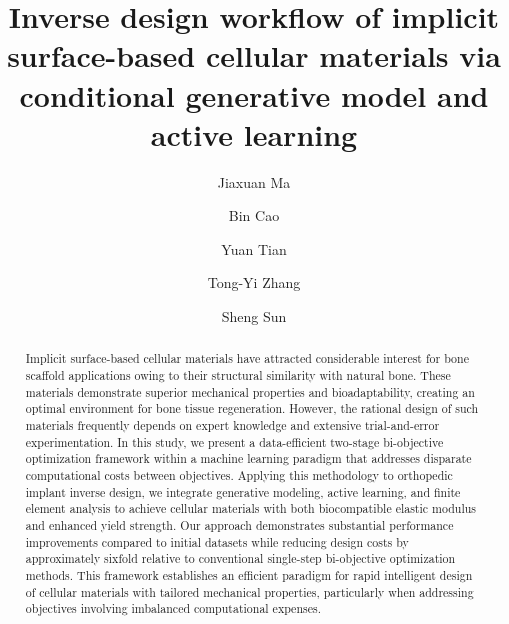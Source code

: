 \documentclass[preprint,review,12pt,authoryear]{elsarticle}
\begin{document}
\begin{frontmatter}
\title{Inverse design workflow of implicit surface-based cellular materials via conditional generative model and active learning}

\author[1]{Jiaxuan Ma}
\author[3]{Bin Cao}
\author[1]{Yuan Tian}
\author[3]{Tong-Yi Zhang}
\author[1,2]{Sheng Sun}

\address[1]{Materials Genome Institute, Shanghai University, Shanghai, 200444, China}
\address[2]{Shanghai Frontier Science Center of Mechanoinformatics, Shanghai University, Shanghai, 200444, China}
\address[3]{Advanced Materials Thrust, Hong Kong University of Science and Technology (Guangzhou), Guangzhou, 511400, Guangdong, China}


\begin{abstract}
Implicit surface-based cellular materials have attracted considerable interest for bone scaffold applications owing to their structural similarity with natural bone. These materials demonstrate superior mechanical properties and bioadaptability, creating an optimal environment for bone tissue regeneration. However, the rational design of such materials frequently depends on expert knowledge and extensive trial-and-error experimentation. In this study, we present a data-efficient two-stage bi-objective optimization framework within a machine learning paradigm that addresses disparate computational costs between objectives. Applying this methodology to orthopedic implant inverse design, we integrate generative modeling, active learning, and finite element analysis to achieve cellular materials with both biocompatible elastic modulus and enhanced yield strength. Our approach demonstrates substantial performance improvements compared to initial datasets while reducing design costs by approximately sixfold relative to conventional single-step bi-objective optimization methods. This framework establishes an efficient paradigm for rapid intelligent design of cellular materials with tailored mechanical properties, particularly when addressing objectives involving imbalanced computational expenses.
\end{abstract}

\begin{graphicalabstract}
\end{graphicalabstract}


\end{frontmatter}
\end{document}
